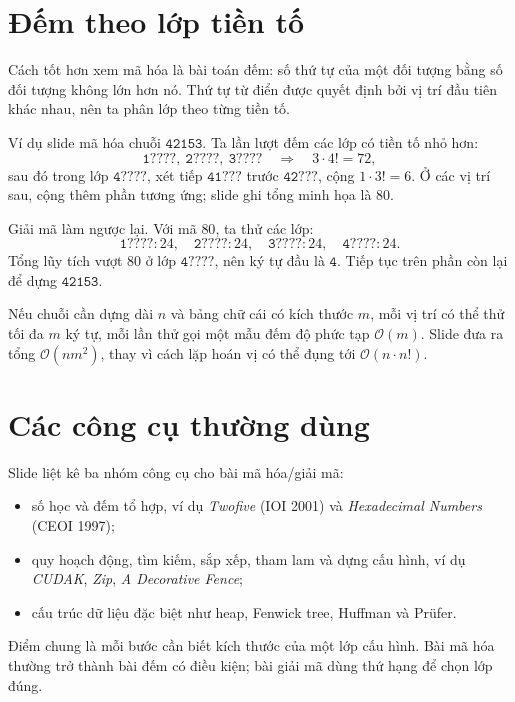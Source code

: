\documentclass[11pt]{article}
\newcommand{\Oh}{\mathcal{O}}
\begin{document}
\section{Đếm theo lớp tiền tố}

Cách tốt hơn xem mã hóa là bài toán đếm: số thứ tự của một đối tượng bằng số
đối tượng không lớn hơn nó. Thứ tự từ điển được quyết định bởi vị trí đầu tiên
khác nhau, nên ta phân lớp theo từng tiền tố.

Ví dụ slide mã hóa chuỗi \(\texttt{42153}\). Ta lần lượt đếm các lớp có tiền
tố nhỏ hơn:
\[
  \texttt{1????},\ \texttt{2????},\ \texttt{3????}
  \quad\Rightarrow\quad 3\cdot 4!=72,
\]
sau đó trong lớp \(\texttt{4????}\), xét tiếp \(\texttt{41???}\) trước
\(\texttt{42???}\), cộng \(1\cdot3!=6\). Ở các vị trí sau, cộng thêm phần
tương ứng; slide ghi tổng minh họa là \(80\).

Giải mã làm ngược lại. Với mã \(80\), ta thử các lớp:
\[
\texttt{1????}:24,\quad
\texttt{2????}:24,\quad
\texttt{3????}:24,\quad
\texttt{4????}:24.
\]
Tổng lũy tích vượt \(80\) ở lớp \(\texttt{4????}\), nên ký tự đầu là
\(\texttt{4}\). Tiếp tục trên phần còn lại để dựng \(\texttt{42153}\).

Nếu chuỗi cần dựng dài \(n\) và bảng chữ cái có kích thước \(m\), mỗi vị trí
có thể thử tối đa \(m\) ký tự, mỗi lần thử gọi một mẫu đếm độ phức tạp
\(\Oh(m)\). Slide đưa ra tổng \(\Oh(nm^2)\), thay vì cách lặp hoán vị có thể
đụng tới \(\Oh(n\cdot n!)\).

\section{Các công cụ thường dùng}

Slide liệt kê ba nhóm công cụ cho bài mã hóa/giải mã:
\begin{itemize}
  \item số học và đếm tổ hợp, ví dụ \textit{Twofive} (IOI 2001) và
  \textit{Hexadecimal Numbers} (CEOI 1997);
  \item quy hoạch động, tìm kiếm, sắp xếp, tham lam và dựng cấu hình, ví dụ
  \textit{CUDAK}, \textit{Zip}, \textit{A Decorative Fence};
  \item cấu trúc dữ liệu đặc biệt như heap, Fenwick tree, Huffman và Prüfer.
\end{itemize}

Điểm chung là mỗi bước cần biết kích thước của một lớp cấu hình. Bài mã hóa
thường trở thành bài đếm có điều kiện; bài giải mã dùng thứ hạng để chọn lớp
đúng.
\end{document}
